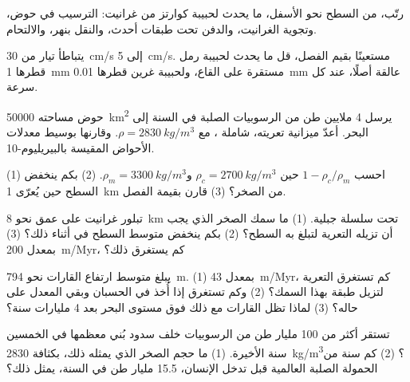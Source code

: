 \begin{exercise}[$\star$]\label{exo:g12:destruction-of-mountains:5}
رتّب، من السطح نحو الأسفل، ما يحدث لحبيبة كوارتز
من غرانيت: الترسيب في حوض، وتجوية الغرانيت، والدفن تحت
طبقات أحدث، والنقل بنهر، والالتحام.
\end{exercise}

\begin{exercise}[$\star\star$]\label{exo:g12:destruction-of-mountains:6}
يتباطأ تيار من \qty{30}{cm/s} إلى \qty{5}{cm/s}. مستعينًا بقيم
الفصل، قل ما يحدث لحبيبة رمل قطرها \qty{1}{mm} مستقرة على
القاع، ولحبيبة غرين قطرها \qty{0.01}{mm} عالقة أصلًا، عند
كل سرعة.
\end{exercise}

\begin{exercise}[$\star\star$]\label{exo:g12:destruction-of-mountains:7}
حوض مساحته \qty{50000}{km^2} يرسل 4 ملايين طن من الرسوبيات الصلبة في السنة
إلى البحر. أعدّ ميزانية تعريته، شاملة ، مع $\rho =
\qty{2830}{kg/m^3}$. وقارنها بوسيط معدلات الأحواض المقيسة بالبيريليوم-10.
\end{exercise}

\begin{exercise}[$\star\star$]\label{exo:g12:destruction-of-mountains:8}
(1) احسب $1 - \rho_c/\rho_m$ حين $\rho_c = \qty{2700}{kg/m^3}$
و$\rho_m = \qty{3300}{kg/m^3}$. (2) بكم ينخفض السطح حين
يُعرّى \qty{1}{km} من الصخر؟ (3) قارن بقيمة الفصل.
\end{exercise}

\begin{exercise}[$\star\star$]\label{exo:g12:destruction-of-mountains:9}
تبلور غرانيت على عمق نحو \qty{8}{km} تحت سلسلة جبلية. (1) ما
سمك الصخر الذي يجب أن تزيله التعرية لتبلغ به السطح؟ (2) بكم
ينخفض متوسط السطح في أثناء ذلك؟ (3) بمعدل \qty{200}{m/Myr}،
كم يستغرق ذلك؟
\end{exercise}

\begin{exercise}[$\star\star$]\label{exo:g12:destruction-of-mountains:10}
يبلغ متوسط ارتفاع القارات نحو \qty{794}{m}. (1) بمعدل
\qty{43}{m/Myr}، كم تستغرق التعرية لتزيل طبقة بهذا السمك؟
(2) وكم تستغرق إذا أُخذ  في الحسبان وبقي المعدل
على حاله؟ (3) لماذا تظل القارات مع ذلك فوق مستوى البحر
بعد 4 مليارات سنة؟
\end{exercise}

\begin{exercise}[$\star\star$]\label{exo:g12:destruction-of-mountains:11}
تستقر أكثر من 100 مليار طن من الرسوبيات خلف سدود بُني معظمها في
الخمسين سنة الأخيرة. (1) ما حجم الصخر الذي يمثله ذلك، بكثافة
\qty{2830}{kg/m^3}؟ (2) كم سنة من الحمولة الصلبة العالمية قبل تدخل الإنسان،
15.5 مليار طن في السنة، يمثل ذلك؟
\end{exercise}

